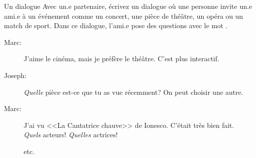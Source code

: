 \begin{frame}{Un dialogue}
  Avec un.e partenaire, écrivez un dialogue où une personne invite un.e ami.e à un événement comme un concert, une pièce de théâtre, un opéra ou un match de sport.
  Dans ce dialogue, l'ami.e pose des questions avec le mot .
  \begin{description}
    \item[Marc:] J'aime le cinéma, mais je préfère le théâtre. C'est plus interactif.
    \item[Joseph:] \emph{Quelle} pièce est-ce que tu as vue récemment? On peut choisir une autre.
    \item[Marc:] J'ai vu <<La Cantatrice chauve>> de Ionesco. C'était très bien fait. \emph{Quels} acteurs! \emph{Quelles} actrices!
    \item[] etc.
  \end{description}
\end{frame}
